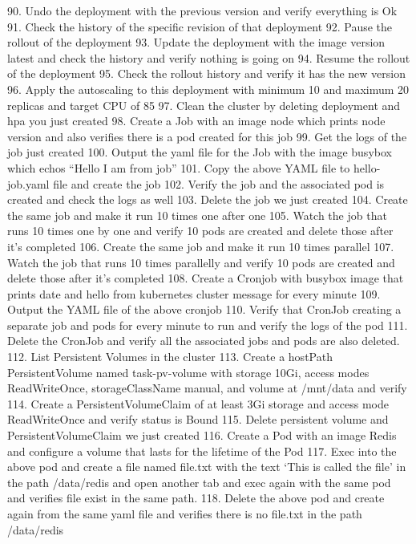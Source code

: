 90. Undo the deployment with the previous version and verify everything is Ok
91. Check the history of the specific revision of that deployment
92. Pause the rollout of the deployment
93. Update the deployment with the image version latest and check the history and verify nothing is going on
94. Resume the rollout of the deployment
95. Check the rollout history and verify it has the new version
96. Apply the autoscaling to this deployment with minimum 10 and maximum 20 replicas and target CPU of 85%
97. Clean the cluster by deleting deployment and hpa you just created
98. Create a Job with an image node which prints node version and also verifies there is a pod created for this job
99. Get the logs of the job just created
100. Output the yaml file for the Job with the image busybox which echos “Hello I am from job”
101. Copy the above YAML file to hello-job.yaml file and create the job
102. Verify the job and the associated pod is created and check the logs as well
103. Delete the job we just created
104. Create the same job and make it run 10 times one after one
105. Watch the job that runs 10 times one by one and verify 10 pods are created and delete those after it’s completed
106. Create the same job and make it run 10 times parallel
107. Watch the job that runs 10 times parallelly and verify 10 pods are created and delete those after it’s completed
108. Create a Cronjob with busybox image that prints date and hello from kubernetes cluster message for every minute
109. Output the YAML file of the above cronjob
110. Verify that CronJob creating a separate job and pods for every minute to run and verify the logs of the pod
111. Delete the CronJob and verify all the associated jobs and pods are also deleted.
112. List Persistent Volumes in the cluster
113. Create a hostPath PersistentVolume named task-pv-volume with storage 10Gi, access modes ReadWriteOnce, storageClassName manual, and volume at /mnt/data and verify
114. Create a PersistentVolumeClaim of at least 3Gi storage and access mode ReadWriteOnce and verify status is Bound
115. Delete persistent volume and PersistentVolumeClaim we just created
116. Create a Pod with an image Redis and configure a volume that lasts for the lifetime of the Pod
117. Exec into the above pod and create a file named file.txt with the text ‘This is called the file’ in the path /data/redis and open another tab and exec again with the same pod and verifies file exist in the same path.
118. Delete the above pod and create again from the same yaml file and verifies there is no file.txt in the path /data/redis
